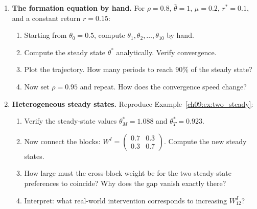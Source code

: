 \documentclass[../structural_economics_book.tex]{subfiles}
\begin{document}
\begin{enumerate}[label=\textbf{9.\arabic*}, leftmargin=3em]

\item \textbf{The formation equation by hand.} For $\rho = 0.8$, $\bar{\theta} = 1$, $\mu = 0.2$, $r^* = 0.1$, and a constant return $r = 0.15$:
\begin{enumerate}
\item Starting from $\theta_0 = 0.5$, compute $\theta_1, \theta_2, \ldots, \theta_{10}$ by hand.
\item Compute the steady state $\theta^*$ analytically. Verify convergence.
\item Plot the trajectory. How many periods to reach 90\% of the steady state?
\item Now set $\rho = 0.95$ and repeat. How does the convergence speed change?
\end{enumerate}

\item \textbf{Heterogeneous steady states.} Reproduce Example~\ref{ch09:ex:two_steady}:
\begin{enumerate}
\item Verify the steady-state values $\theta_M^* = 1.088$ and $\theta_T^* = 0.923$.
\item Now connect the blocks: $W^I = \begin{pmatrix} 0.7 & 0.3 \\ 0.3 & 0.7 \end{pmatrix}$. Compute the new steady states.
\item How large must the cross-block weight be for the two steady-state preferences to coincide? Why does the gap vanish exactly there?
\item Interpret: what real-world intervention corresponds to increasing $W^I_{12}$?
\end{enumerate}


\end{enumerate}
\end{document}
